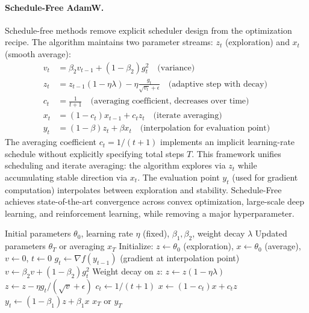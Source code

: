 \documentclass[11pt,a4paper]{article}
\begin{document}
\paragraph{Schedule-Free AdamW.}
Schedule-free methods remove explicit scheduler design from the optimization recipe. The algorithm maintains two parameter streams: $z_t$ (exploration) and $x_t$ (smooth average):
\begin{align}
v_t &= \beta_2 v_{t-1} + (1-\beta_2)g_t^2 \quad\text{(variance)} \\
z_t &= z_{t-1}(1-\eta\lambda) - \eta\frac{g_t}{\sqrt{v_t}+\epsilon} \quad\text{(adaptive step with decay)} \\
c_t &= \frac{1}{t+1} \quad\text{(averaging coefficient, decreases over time)} \\
x_t &= (1-c_t)x_{t-1} + c_t z_t \quad\text{(iterate averaging)} \\
y_t &= (1-\beta)z_t + \beta x_t \quad\text{(interpolation for evaluation point)}
\end{align}
The averaging coefficient $c_t = 1/(t+1)$ implements an implicit learning-rate schedule without explicitly specifying total steps $T$. This framework unifies scheduling and iterate averaging: the algorithm explores via $z_t$ while accumulating stable direction via $x_t$. The evaluation point $y_t$ (used for gradient computation) interpolates between exploration and stability. Schedule-Free achieves state-of-the-art convergence across convex optimization, large-scale deep learning, and reinforcement learning, while removing a major hyperparameter.

\begin{algorithm}[H]
\caption{Schedule-Free AdamW}
\label{alg:schedulefree}
\begin{algorithmic}[1]
\Require Initial parameters $\theta_0$, learning rate $\eta$ (fixed), $\beta_1, \beta_2$, weight decay $\lambda$
\Ensure Updated parameters $\theta_T$ or averaging $x_T$
\State Initialize: $z \gets \theta_0$ (exploration), $x \gets \theta_0$ (average), $v \gets 0$, $t \gets 0$
    \State $g_t \gets \nabla f(y_{t-1})$ (gradient at interpolation point)
    \State $v \gets \beta_2 v + (1-\beta_2) g_t^2$ 
    \State Weight decay on $z$: $z \gets z(1 - \eta\lambda)$
    \State $z \gets z - \eta g_t / (\sqrt{v} + \epsilon)$ 
    \State $c_t \gets 1 / (t+1)$ 
    \State $x \gets (1-c_t) x + c_t z$ 
    \State $y_t \gets (1-\beta_1) z + \beta_1 x$ 
\EndFor
\Return $x_T$ or $y_T$
\end{algorithmic}
\end{algorithm}
\end{document}
